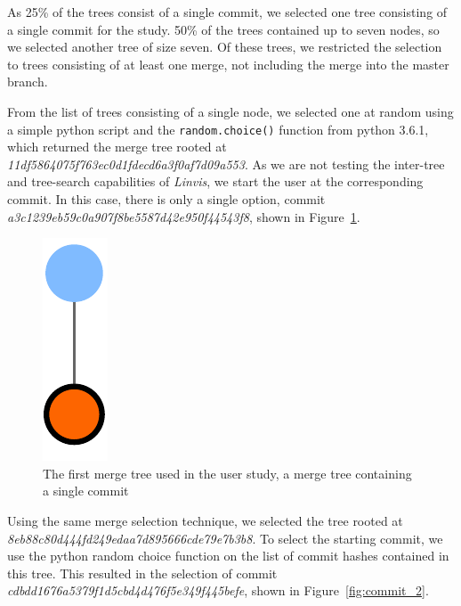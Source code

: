 As 25\% of the trees consist of a single commit, we selected one tree
consisting of a single commit for the study. 50\% of the trees contained
up to seven nodes, so we selected another tree of size seven.  Of these
trees, we restricted the selection to trees consisting of at least one
merge, not including the merge into the master branch.

From the list of trees consisting of a single node, we selected one at
random using a simple python script and the \verb|random.choice()|
function from python 3.6.1, which returned the merge tree rooted at
\emph{11df5864075f763ec0d1fdecd6a3f0af7d09a553}. As we are not testing
the inter-tree and tree-search capabilities of \emph{Linvis}, we start
the user at the corresponding commit. In this case, there is only a
single option, commit \emph{a3c1239eb59c0a907f8be5587d42e950f44543f8},
shown in Figure~\ref{fig:commit_1}.

\begin{figure}[htpb]
  \centering
  \includegraphics[width=0.2\linewidth]{figures/commits/1-commit.pdf}
  \caption{The first merge tree used in the user study, a merge tree
    containing a single commit}
  \label{fig:commit_1}
\end{figure}

Using the same merge selection technique, we selected the tree rooted at
\emph{8eb88c80d444fd249edaa7d895666cde79e7b3b8}. To select the starting
commit, we use the python random choice function on the list of commit
hashes contained in this tree. This resulted in the selection of commit
\emph{cdbdd1676a5379f1d5cbd4d476f5e349f445befe}, shown in
Figure~\ref{fig:commit_2}.


